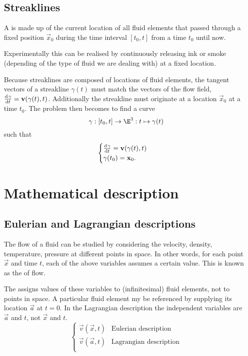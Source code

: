 \subsection{Streaklines}
A  is made up of the current location of all fluid elements that passed through a fixed position $\vec{x}_0$ during the time interval $[t_0, t]$ from a time $t_0$ until now.

Experimentally this can be realised by continuously releasing ink or smoke (depending of the type of fluid we are dealing with) at a fixed location.

Because streaklines are composed of locations of fluid elements, the tangent vectors of a streakline $\gamma(t)$ must match the vectors of the flow field, $\od{\gamma}{t} = \vec{v}(\gamma(t),t)$. Additionally the streakline must originate at a location $\vec{x}_0$ at a time $t_0$. The problem then becomes to find a curve
\[ \gamma: [t_0, t] \to \E^3: t\mapsto \gamma(t) \]
such that
\[ \begin{cases}
\od{\gamma}{t} = \vec{v}(\gamma(t),t) \\
\gamma(t_0) = \vec{x}_0.
\end{cases} \]

\section{Mathematical description}
\subsection{Eulerian and Lagrangian descriptions}
The flow of a fluid can be studied by considering the velocity, density, temperature, pressure at different points in space. In other words, for each point $\vec{x}$ and time $t$, each of the above variables assumes a certain value. This is known as the  of flow.

The  assigns values of these variables to (infinitesimal) fluid elements, not to points in space. A particular fluid element my be referenced by supplying its location $\vec{a}$ at $t=0$. In the Lagrangian description the independent variables are $\vec{a}$ and $t$, not $\vec{x}$ and $t$.
\[ \begin{cases}
\vec{v}(\vec{x},t) & \text{Eulerian description} \\
\vec{v}(\vec{a},t) & \text{Lagrangian description} \\
\end{cases} \]

